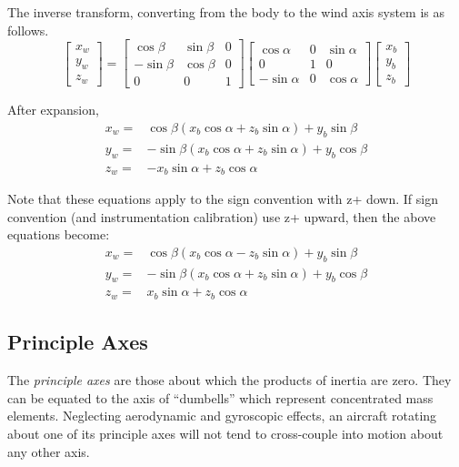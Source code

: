 \documentclass[
]{book}
\begin{document}
The inverse transform, converting from the body to the wind axis system is as follows.
\[
\begin{bmatrix}
x_w \\
y_w \\
z_w
\end{bmatrix} = 
\begin{bmatrix}
\cos \beta & \sin \beta & 0 \\
-\sin \beta & \cos \beta & 0 \\
0 & 0 & 1
\end{bmatrix}
\begin{bmatrix}
\cos \alpha & 0 & \sin \alpha \\
0 & 1 & 0 \\
-\sin \alpha & 0 & \cos \alpha
\end{bmatrix}
\begin{bmatrix}
x_b \\
y_b \\
z_b 
\end{bmatrix}
\]

After expansion,
\[
\begin{align}
x_w =& \cos \beta (x_b \cos \alpha + z_b \sin \alpha) + y_b \sin \beta \\
y_w =& -\sin \beta(x_b \cos \alpha + z_b \sin \alpha) + y_b \cos \beta \\
z_w =& -x_b \sin \alpha + z_b \cos \alpha 
\end{align}
\]

Note that these equations apply to the sign convention with z+ down. If sign convention (and instrumentation calibration) use z+ upward, then the above equations become:
\[
\begin{align}
x_w =& \cos \beta (x_b \cos \alpha - z_b \sin \alpha) + y_b \sin \beta \\
y_w =& -\sin \beta(x_b \cos \alpha + z_b \sin \alpha) + y_b \cos \beta \\
z_w =& x_b \sin \alpha + z_b \cos \alpha 
\end{align}
\]

\hypertarget{principle-axes}{%
\subsection{Principle Axes}\label{principle-axes}}

The \emph{principle axes} are those about which the products of inertia are zero. They can be equated to the axis of ``dumbells'' which represent concentrated mass elements. Neglecting aerodynamic and gyroscopic effects, an aircraft rotating about one of its principle axes will not tend to cross-couple into motion about any other axis.
\end{document}
